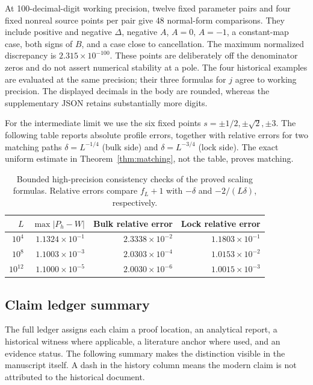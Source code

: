 At 100-decimal-digit working precision, twelve fixed parameter pairs and four fixed nonreal source points per pair give 48 normal-form comparisons. They include positive and negative \(\Delta\), negative \(A\), \(A=0\), \(A=-1\), a constant-map case, both signs of \(B\), and a case close to cancellation. The maximum normalized discrepancy is \(2.315\times10^{-100}\). These points are deliberately off the denominator zeros and do not assert numerical stability at a pole. The four historical examples are evaluated at the same precision; their three formulas for \(j\) agree to working precision. The displayed decimals in the body are rounded, whereas the supplementary JSON retains substantially more digits.

For the intermediate limit we use the six fixed points \(s=\pm1/2,\pm\sqrt2,\pm3\). The following table reports absolute profile errors, together with relative errors for two matching paths \(\delta=L^{-1/4}\) (bulk side) and \(\delta=L^{-3/4}\) (lock side). The exact uniform estimate in Theorem~\ref{thm:matching}, not the table, proves matching.
\begin{table}[htbp]\centering\small
\begin{tabular}{rrrr}\toprule
\(L\) & \(\max|P_h-W|\) & Bulk relative error & Lock relative error\\\midrule
\(10^4\) & \(1.1324\times10^{-1}\) & \(2.3338\times10^{-2}\) & \(1.1803\times10^{-1}\)\\
\(10^8\) & \(1.1003\times10^{-3}\) & \(2.0303\times10^{-4}\) & \(1.0153\times10^{-2}\)\\
\(10^{12}\) & \(1.1000\times10^{-5}\) & \(2.0030\times10^{-6}\) & \(1.0015\times10^{-3}\)\\\bottomrule
\end{tabular}\caption{Bounded high-precision consistency checks of the proved scaling formulas. Relative errors compare \(f_L+1\) with \(-\delta\) and \(-2/(L\delta)\), respectively.}\label{tab:numerics}
\end{table}

\subsection{Claim ledger summary}
The full ledger assigns each claim a proof location, an analytical report, a historical witness where applicable, a literature anchor where used, and an evidence status. The following summary makes the distinction visible in the manuscript itself. A dash in the history column means the modern claim is not attributed to the historical document.

